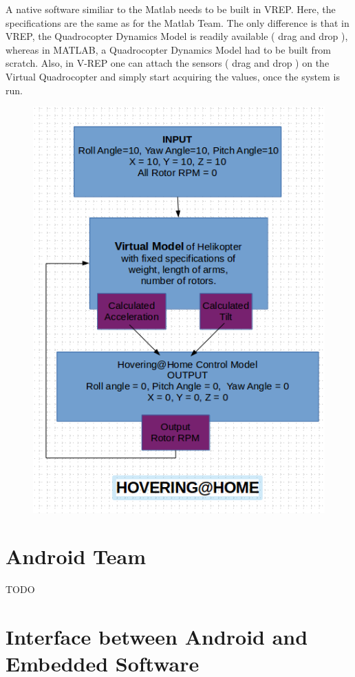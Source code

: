 \documentclass[a4paper,11pt]{article}
\begin{document}
A native software similiar to the Matlab needs to be built in VREP. Here, the specifications are the same as for the Matlab Team. The only difference is that in VREP, the Quadrocopter Dynamics Model is readily available ( drag and drop ), whereas in MATLAB, a Quadrocopter Dynamics Model had to be built from scratch. Also, in V-REP one can attach the sensors ( drag and drop ) on the Virtual Quadrocopter and simply start acquiring the values, once the system is run.

\begin{figure}[ht]
\centering
\includegraphics[scale=0.5]{pics/VirtualReality.png}
\end{figure}

\pagebreak
\section{Android Team}

TODO

\pagebreak
\section{Interface between Android and Embedded Software }
\end{document}
